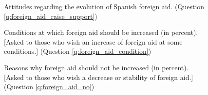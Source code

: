\documentclass[12pt,english]{article}
\begin{document}
\begin{figure}[h!]
    \caption[Attitudes on the evolution of foreign aid]{Attitudes regarding the evolution of Spanish foreign aid. (Question \ref{q:foreign_aid_raise_support})}\label{fig:foreign_aid_raise_support}
\end{figure}

\begin{figure}[h!]
    \caption[Conditions at which foreign aid should be increased]{Conditions at which foreign aid should be increased (in percent). [Asked to those who wish an increase of foreign aid at some conditions.] (Question \ref{q:foreign_aid_condition})}\label{fig:foreign_aid_condition}
\end{figure}

\begin{figure}[h!]
    \caption[Reasons why foreign aid should not be increased]{Reasons why foreign aid should not be increased (in percent). [Asked to those who wish a decrease or stability of foreign aid.] (Question \ref{q:foreign_aid_no})}\label{fig:foreign_aid_no}
\end{figure}
\end{document}

